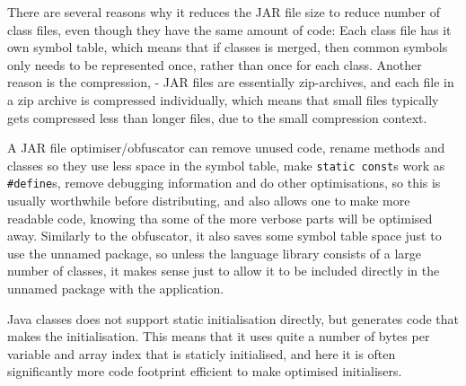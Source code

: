 There are several reasons why it reduces the JAR file size to reduce number of class files, even though they have the same amount of code: Each class file has it own symbol table, which means that if classes is merged, then common symbols only needs to be represented once, rather than once for each class.
Another reason is the compression, - JAR files are essentially zip-archives, and each file in a zip archive is compressed individually\cite{zipspec}, which means that small files typically gets compressed less than longer files, due to the small compression context.

A JAR file optimiser/obfuscator can remove unused code, rename methods and classes so they use less space in the symbol table, make \verb|static const|s work as \verb|#define|s, remove debugging information and do other optimisations, so this is usually worthwhile before distributing, and also allows one to make more readable code, knowing tha some of the more verbose parts will be optimised away.
Similarly to the obfuscator, it also saves some symbol table space just to use the unnamed package, so unless the language library consists of a large number of classes, it makes sense just to allow it to be included directly in the unnamed package with the application.

Java classes does not support static initialisation directly, but generates code that makes the initialisation. This means that it uses quite a number of bytes per variable and array index that is staticly initialised, and here it is often significantly more code footprint efficient to make optimised initialisers.

